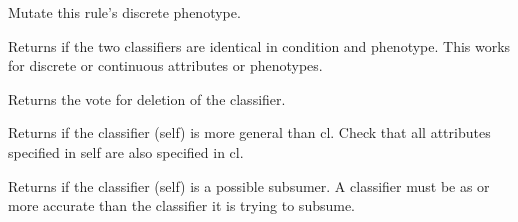 \documentclass[letterpaper,10pt,english]{sphinxmanual}
\begin{document}
\begin{fulllineitems}
\begin{fulllineitems}
\label{\detokenize{eLCS:eLCS.Classifier.Classifier.discretePhenotypeMutation}}
Mutate this rule’s discrete phenotype.

\end{fulllineitems}


\begin{fulllineitems}
\label{\detokenize{eLCS:eLCS.Classifier.Classifier.equals}}
Returns if the two classifiers are identical in condition and phenotype. This works for discrete or continuous attributes or phenotypes.

\end{fulllineitems}


\begin{fulllineitems}
\label{\detokenize{eLCS:eLCS.Classifier.Classifier.getDelProp}}
Returns the vote for deletion of the classifier.

\end{fulllineitems}


\begin{fulllineitems}
\label{\detokenize{eLCS:eLCS.Classifier.Classifier.isMoreGeneral}}
Returns if the classifier (self) is more general than cl. Check that all attributes specified in self are also specified in cl.

\end{fulllineitems}


\begin{fulllineitems}
\label{\detokenize{eLCS:eLCS.Classifier.Classifier.isSubsumer}}
Returns if the classifier (self) is a possible subsumer. A classifier must be as or more accurate than the classifier it is trying to subsume.

\end{fulllineitems}


\end{fulllineitems}
\end{document}
